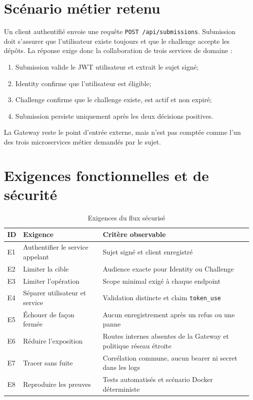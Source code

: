 \documentclass[12pt,a4paper,oneside]{report}
\newcommand{\code}[1]{\texttt{#1}}
\begin{document}
\section{Scénario métier retenu}
Un client authentifié envoie une requête \code{POST /api/submissions}. Submission
doit s'assurer que l'utilisateur existe toujours et que le challenge accepte les
dépôts. La réponse exige donc la collaboration de trois services de domaine :

\begin{enumerate}
  \item Submission valide le JWT utilisateur et extrait le sujet signé;
  \item Identity confirme que l'utilisateur est éligible;
  \item Challenge confirme que le challenge existe, est actif et non expiré;
  \item Submission persiste uniquement après les deux décisions positives.
\end{enumerate}

La Gateway reste le point d'entrée externe, mais n'est pas comptée comme l'un
des trois microservices métier demandés par le sujet.

\section{Exigences fonctionnelles et de sécurité}
\begin{table}[H]
\centering
\caption{Exigences du flux sécurisé}
\label{tab:requirements}
\begin{tabularx}{\textwidth}{P{1.5cm}Y Y}
\toprule
\textbf{ID} & \textbf{Exigence} & \textbf{Critère observable} \\
\midrule
E1 & Authentifier le service appelant & Sujet signé et client enregistré \\
E2 & Limiter la cible & Audience exacte pour Identity ou Challenge \\
E3 & Limiter l'opération & Scope minimal exigé à chaque endpoint \\
E4 & Séparer utilisateur et service & Validation distincte et claim \code{token\_use} \\
E5 & Échouer de façon fermée & Aucun enregistrement après un refus ou une panne \\
E6 & Réduire l'exposition & Routes internes absentes de la Gateway et politique réseau étroite \\
E7 & Tracer sans fuite & Corrélation commune, aucun bearer ni secret dans les logs \\
E8 & Reproduire les preuves & Tests automatisés et scénario Docker déterministe \\
\bottomrule
\end{tabularx}
\end{table}
\end{document}
